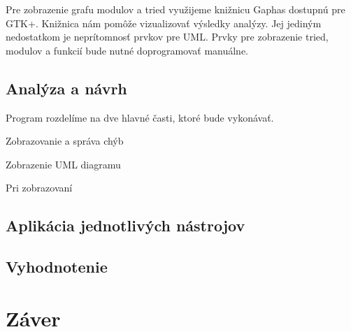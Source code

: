 \documentclass[11pt,oneside,final]{fithesis2}
\begin{document}
		Pre zobrazenie grafu modulov a tried využijeme knižnicu Gaphas dostupnú pre GTK+. Knižnica nám pomôže vizualizovať výsledky analýzy. Jej jediným nedostatkom je neprítomnosť prvkov pre UML. Prvky pre zobrazenie tried, modulov a funkcií bude nutné doprogramovať manuálne.


	\section{Analýza a návrh}
		
		Program rozdelíme na dve hlavné časti, ktoré bude vykonávať.
		
			    \begin{list}{•}{}
					\item Zobrazovanie a správa chýb
					\item Zobrazenie UML diagramu
    			\end{list}
    			
    	Pri zobrazovaní 

	\section{Aplikácia jednotlivých nástrojov}
		
	\section{Vyhodnotenie}	

\chapter{Záver}
\end{document}
